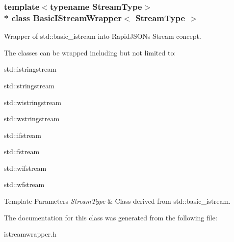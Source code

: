 \subsubsection*{template$<$typename Stream\+Type$>$\\*
class Basic\+I\+Stream\+Wrapper$<$ Stream\+Type $>$}

Wrapper of {\ttfamily std\+::basic\+\_\+istream} into Rapid\+J\+S\+ON\textquotesingle{}s Stream concept. 

The classes can be wrapped including but not limited to\+:


\begin{DoxyItemize}
\item {\ttfamily std\+::istringstream} 
\item {\ttfamily std\+::stringstream} 
\item {\ttfamily std\+::wistringstream} 
\item {\ttfamily std\+::wstringstream} 
\item {\ttfamily std\+::ifstream} 
\item {\ttfamily std\+::fstream} 
\item {\ttfamily std\+::wifstream} 
\item {\ttfamily std\+::wfstream} 
\end{DoxyItemize}


\begin{DoxyTemplParams}{Template Parameters}
{\em Stream\+Type} & Class derived from {\ttfamily std\+::basic\+\_\+istream}. \\
\hline
\end{DoxyTemplParams}


The documentation for this class was generated from the following file\+:\begin{DoxyCompactItemize}
\item 
istreamwrapper.\+h\end{DoxyCompactItemize}
